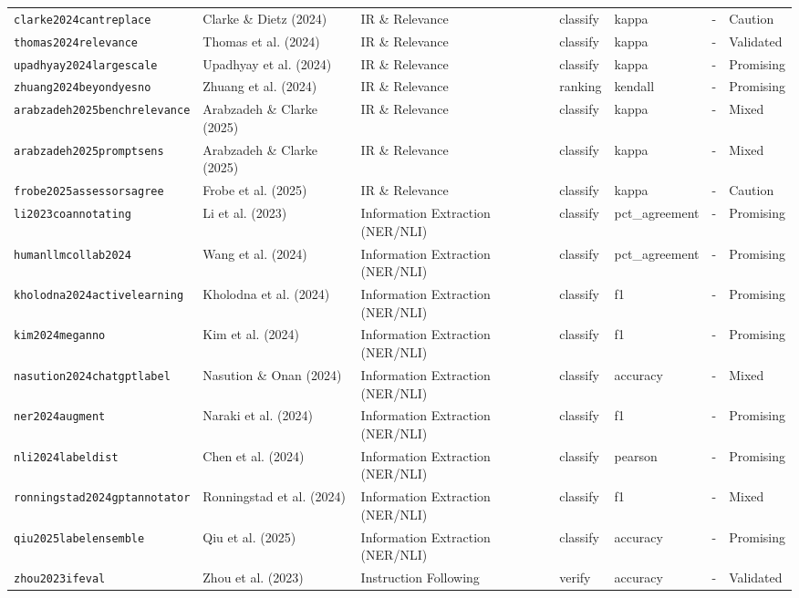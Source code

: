 \begin{longtable}{@{}l l l l l c l@{}}
\texttt{clarke2024cantreplace} & Clarke \& Dietz (2024) & IR \& Relevance & classify & kappa & - & Caution \\
\texttt{thomas2024relevance} & Thomas et al. (2024) & IR \& Relevance & classify & kappa & - & Validated \\
\texttt{upadhyay2024largescale} & Upadhyay et al. (2024) & IR \& Relevance & classify & kappa & - & Promising \\
\texttt{zhuang2024beyondyesno} & Zhuang et al. (2024) & IR \& Relevance & ranking & kendall & - & Promising \\
\texttt{arabzadeh2025benchrelevance} & Arabzadeh \& Clarke (2025) & IR \& Relevance & classify & kappa & - & Mixed \\
\texttt{arabzadeh2025promptsens} & Arabzadeh \& Clarke (2025) & IR \& Relevance & classify & kappa & - & Mixed \\
\texttt{frobe2025assessorsagree} & Frobe et al. (2025) & IR \& Relevance & classify & kappa & - & Caution \\
\texttt{li2023coannotating} & Li et al. (2023) & Information Extraction (NER/NLI) & classify & pct\_agreement & - & Promising \\
\texttt{humanllmcollab2024} & Wang et al. (2024) & Information Extraction (NER/NLI) & classify & pct\_agreement & - & Promising \\
\texttt{kholodna2024activelearning} & Kholodna et al. (2024) & Information Extraction (NER/NLI) & classify & f1 & - & Promising \\
\texttt{kim2024meganno} & Kim et al. (2024) & Information Extraction (NER/NLI) & classify & f1 & - & Promising \\
\texttt{nasution2024chatgptlabel} & Nasution \& Onan (2024) & Information Extraction (NER/NLI) & classify & accuracy & - & Mixed \\
\texttt{ner2024augment} & Naraki et al. (2024) & Information Extraction (NER/NLI) & classify & f1 & - & Promising \\
\texttt{nli2024labeldist} & Chen et al. (2024) & Information Extraction (NER/NLI) & classify & pearson & - & Promising \\
\texttt{ronningstad2024gptannotator} & Ronningstad et al. (2024) & Information Extraction (NER/NLI) & classify & f1 & - & Mixed \\
\texttt{qiu2025labelensemble} & Qiu et al. (2025) & Information Extraction (NER/NLI) & classify & accuracy & - & Promising \\
\texttt{zhou2023ifeval} & Zhou et al. (2023) & Instruction Following & verify & accuracy & - & Validated \\

\end{longtable}
